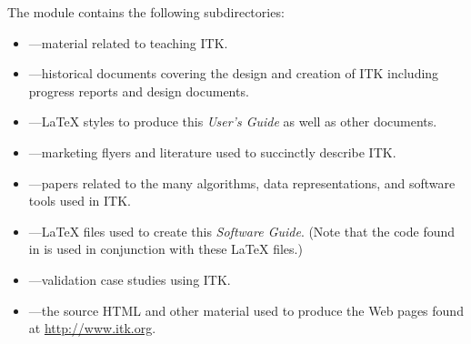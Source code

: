 The  module contains the following subdirectories:
\begin{itemize}
        \item {}---material related to
        teaching ITK.
        \item {}---historical documents covering
        the design and creation of ITK including progress reports and 
        design documents.
        \item {}---\LaTeX{} styles to produce this
        \emph{User's Guide} as well as other documents.
        \item {}---marketing flyers and 
        literature used to succinctly describe ITK.
        \item {}---papers related to the many
        algorithms, data representations, and software tools used in ITK.
        \item {}---\LaTeX{} files used to
        create this \emph{Software Guide}. (Note that the code found in
         is used in conjunction with these \LaTeX{}
        files.)
        \item {}---validation case studies
        using ITK.
        \item {}---the source HTML and other material
        used to produce the Web pages found at \url{http://www.itk.org}.
\end{itemize}

